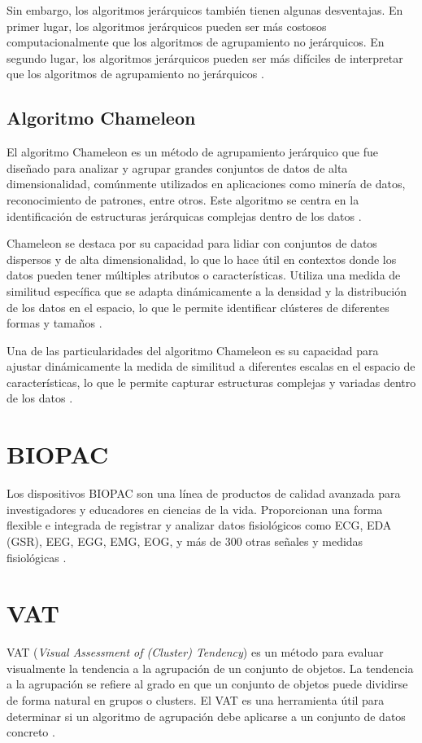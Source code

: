 Sin embargo, los algoritmos jerárquicos también tienen algunas desventajas. En primer lugar, los algoritmos jerárquicos pueden ser más costosos computacionalmente que los algoritmos de agrupamiento no jerárquicos. En segundo lugar, los algoritmos jerárquicos pueden ser más difíciles de interpretar que los algoritmos de agrupamiento no jerárquicos \cite{pascual2007algoritmos}.

\subsection{Algoritmo Chameleon}
El algoritmo Chameleon es un método de agrupamiento jerárquico que fue diseñado para analizar y agrupar grandes conjuntos de datos de alta dimensionalidad, comúnmente utilizados en aplicaciones como minería de datos, reconocimiento de patrones, entre otros. Este algoritmo se centra en la identificación de estructuras jerárquicas complejas dentro de los datos \cite{chameleon}.

Chameleon se destaca por su capacidad para lidiar con conjuntos de datos dispersos y de alta dimensionalidad, lo que lo hace útil en contextos donde los datos pueden tener múltiples atributos o características. Utiliza una medida de similitud específica que se adapta dinámicamente a la densidad y la distribución de los datos en el espacio, lo que le permite identificar clústeres de diferentes formas y tamaños \cite{chameleon}.

Una de las particularidades del algoritmo Chameleon es su capacidad para ajustar dinámicamente la medida de similitud a diferentes escalas en el espacio de características, lo que le permite capturar estructuras complejas y variadas dentro de los datos \cite{chameleon}.

\section{BIOPAC}
Los dispositivos BIOPAC son una línea de productos de calidad avanzada para investigadores y educadores en ciencias de la vida. Proporcionan una forma flexible e integrada de registrar y analizar datos fisiológicos como ECG, EDA (GSR), EEG, EGG, EMG, EOG, y más de 300 otras señales y medidas fisiológicas \cite{BIOPAC}.

\section{VAT}
VAT (\textit{Visual Assessment of (Cluster) Tendency}) es un método para evaluar visualmente la tendencia a la agrupación de un conjunto de objetos. La tendencia a la agrupación se refiere al grado en que un conjunto de objetos puede dividirse de forma natural en grupos o clusters. El VAT es una herramienta útil para determinar si un algoritmo de agrupación debe aplicarse a un conjunto de datos concreto \cite{VAT}.

